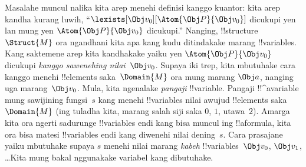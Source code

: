 \documentclass[../../../include/open-logic-section]{subfiles}
\begin{document}
Masalahe muncul nalika kita arep menehi definisi kanggo kuantor: kita
arep kandha kurang luwih, ``$\lexists[\Obj v_0][\Atom{\Obj P}{\Obj
v_0}]$ dicukupi yen lan mung yen $\Atom{\Obj P}{\Obj v_0}$ dicukupi.''
Nanging, !!{structure}~$\Struct{M}$ ora ngandhani kita apa kang kudu
ditindakake marang !!{variable}s. Kang saktemene arep kita kandhakake
yaiku yen $\Atom{\Obj P}{\Obj v_0}$ dicukupi \emph{kanggo sawenehing
nilai~$\Obj v_0$}. Supaya iki trep, kita mbutuhake cara kanggo menehi
!!{element}s saka~$\Domain{M}$ ora mung marang $\Obj a$, nanging uga
marang~$\Obj v_0$. Mula, kita ngenalake \emph{pangaji} !!{variable}.
Pangaji !!^a{variable} mung sawijining fungsi~$s$ kang menehi
!!{variable}s nilai awujud !!{element}s saka~$\Domain{M}$ (ing tuladha kita,
marang salah siji saka $0$, $1$, utawa~$2$). Amarga
kita ora ngerti sadurunge !!{variable}s endi kang bisa muncul ing
!!a{formula}, kita ora bisa matesi !!{variable}s endi kang diwenehi
nilai dening~$s$. Cara prasajane yaiku mbutuhake supaya $s$ menehi nilai
marang \emph{kabeh} !!{variable}s~$\Obj v_0$, $\Obj v_1$, \dots\@ Kita
mung bakal nggunakake variabel kang dibutuhake.
\end{document}
